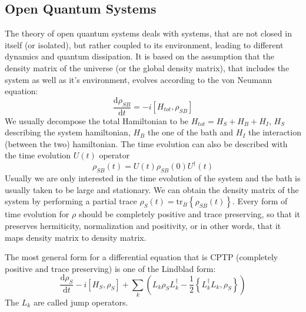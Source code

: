 	\subsection{Open Quantum Systems}
	The theory of open quantum systems deals with systems, that are not closed in itself (or isolated), but rather coupled to its environment, leading to different dynamics and quantum dissipation. It is based on the assumption that the density matrix of the universe (or the global density matrix), that includes the system as well as it's environment, evolves according to the von Neumann equation:
	\begin{equation}
		\frac{\text{d}{\rho_{SB}}}{\text{d}{t}} = - i \left[H_{tot}, \rho_{SB} \right]
	\end{equation}
	We usually decompose the total Hamiltonian to be $H_{tot} =	H_S + H_B + H_I$, $H_S$ describing the system hamiltonian, $H_B$ the one of the bath and $H_I$ the interaction (between the two) hamiltonian. The time evolution can also be described with the time evolution $U(t)$ operator
	\begin{equation}
		\rho_{SB}(t) =	U(t) \rho_{SB}(0) U^\dagger(t)
	\end{equation}
	Usually we are only interested in the time evolution of the system and the bath is usually taken to be large and stationary. We can obtain the density matrix of the system by performing a partial trace $\rho_S(t) =	\text{tr}_B \left\{\rho_{SB}(t)\right\}$. Every form of time evolution for $\rho$ should be completely positive and trace preserving, so that it preserves hermiticity, normalization and positivity, or in other words, that it maps density matrix to density matrix.
	
	The most general form for a differential equation that is CPTP (completely positive and trace preserving) is one of the Lindblad form:
	\begin{equation}
		\frac{\text{d} \rho_S}{\text{d}t} -i \left[H_S, \rho_S\right] + \sum_k \left(L_k \rho_S L_k^\dagger - \frac{1}{2} \left\{L_k^\dagger L_k, \rho_S \right\}\right)
	\end{equation}
	The $L_k$ are called jump operators.
